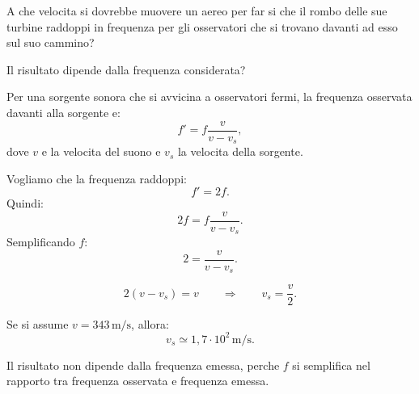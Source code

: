 
\begin{esercizio}
A che velocita si dovrebbe muovere un aereo per far si che il rombo delle sue
turbine raddoppi in frequenza per gli osservatori che si trovano davanti ad
esso sul suo cammino?

Il risultato dipende dalla frequenza considerata?
\end{esercizio}

\begin{soluzione}
Per una sorgente sonora che si avvicina a osservatori fermi, la frequenza
osservata davanti alla sorgente e:
\[
f'=f\frac{v}{v-v_s},
\]
dove \(v\) e la velocita del suono e \(v_s\) la velocita della sorgente.

Vogliamo che la frequenza raddoppi:
\[
f'=2f.
\]
Quindi:
\[
2f=f\frac{v}{v-v_s}.
\]
Semplificando \(f\):
\[
2=\frac{v}{v-v_s}.
\]

\[
2(v-v_s)=v
\qquad\Rightarrow\qquad
v_s=\frac{v}{2}.
\]

Se si assume \(v=343\,\mathrm{m/s}\), allora:
\[
v_s\simeq 1{,}7\cdot 10^2\,\mathrm{m/s}.
\]

Il risultato non dipende dalla frequenza emessa, perche \(f\) si semplifica nel
rapporto tra frequenza osservata e frequenza emessa.
\end{soluzione}
